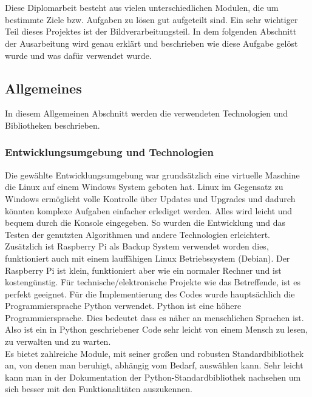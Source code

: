 \chapter{\docname}
\label{\docname}



	Diese Diplomarbeit besteht aus vielen unterschiedlichen Modulen, die um
	bestimmte Ziele bzw. Aufgaben zu lösen gut aufgeteilt sind.
	Ein sehr wichtiger Teil dieses Projektes ist der Bildverarbeitungsteil.
	In dem folgenden Abschnitt der Ausarbeitung wird  genau erklärt und beschrieben
	wie diese Aufgabe gelöst wurde und was dafür verwendet wurde.


\section{Allgemeines}

In diesem Allgemeinen Abschnitt werden die verwendeten Technologien und
Bibliotheken beschrieben.

\subsection{Entwicklungsumgebung und Technologien}


	Die gewählte Entwicklungsumgebung war grundsätzlich eine virtuelle Maschine die
	Linux auf einem Windows System geboten hat. 
	Linux im Gegensatz zu Windows ermöglicht volle Kontrolle über Updates und
	Upgrades und dadurch könnten komplexe Aufgaben einfacher erlediget werden.
	Alles wird leicht und bequem durch die Konsole eingegeben. 
	So wurden die Entwicklung und das Testen der genutzten Algorithmen und andere
	Technologien erleichtert. \cite{linx}\\
	
	Zusätzlich ist Raspberry Pi als Backup System verwendet worden dies, funktioniert
	auch mit einem lauffähigen Linux Betriebssystem (Debian). 
	Der Raspberry Pi ist klein, funktioniert aber wie ein normaler Rechner und ist 
	kostengünstig. Für technische/elektronische Projekte wie das Betreffende, ist es
	perfekt geeignet. 
	Für die Implementierung des Codes wurde hauptsächlich die Programmiersprache
	Python verwendet. 
	Python ist eine höhere Programmiersprache. Dies bedeutet dass es näher an
	menschlichen Sprachen ist. 
	Also ist ein in Python geschriebener Code sehr leicht von einem Mensch zu lesen,
	zu verwalten und zu warten.  \\ 
	
	Es bietet zahlreiche Module, mit seiner großen und robusten Standardbibliothek
	an, von denen man beruhigt, abhängig vom Bedarf, auswählen kann.  
	Sehr leicht kann man in der Dokumentation der Python-Standardbibliothek nachsehen
	um sich besser mit den Funktionalitäten auszukennen. 
	\cite{why_python}
	
